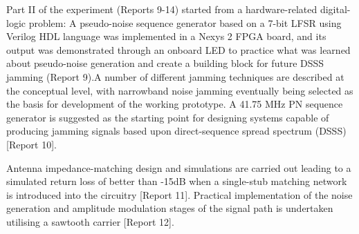 \documentclass[12pt,a4paper]{report}
\begin{document}
	Part II of the experiment (Reports 9-14) started from a hardware-related digital-logic problem: A pseudo-noise sequence generator based on a 7-bit LFSR using Verilog HDL language was implemented in a Nexys 2 FPGA board, and its output was demonstrated through an onboard LED to practice what was learned about pseudo-noise generation and create a building block for future DSSS jamming (Report 9).A number of different jamming techniques are described at the conceptual level, with narrowband noise jamming eventually being selected as the basis for development of the working prototype. A 41.75 MHz PN sequence generator is suggested as the starting point for designing systems capable of producing jamming signals based upon direct-sequence spread spectrum (DSSS) [Report 10]. 
	
	\vspace{0.5cm}
	
	Antenna impedance-matching design and simulations are carried out leading to a simulated return loss of better than -15dB when a single-stub matching network is introduced into the circuitry [Report 11]. Practical implementation of the noise generation and amplitude modulation stages of the signal path is undertaken  utilising a sawtooth carrier [Report 12].
	
	\vspace{0.5cm}
	
\end{document}
